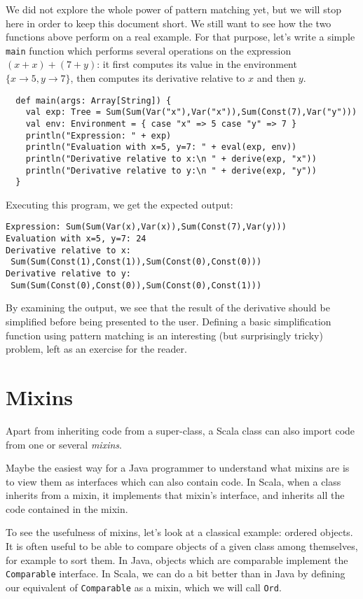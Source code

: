 \documentclass[a4paper,12pt,twoside,titlepage]{article}
\begin{document}
We did not explore the whole power of pattern matching yet, but we
will stop here in order to keep this document short. We still want to
see how the two functions above perform on a real example. For that
purpose, let's write a simple \lstinline?main? function which performs
several operations on the expression $(x+x)+(7+y)$: it first computes
its value in the environment $\{x\rightarrow 5, y\rightarrow 7\}$, then
computes its derivative relative to $x$ and then $y$.
\begin{lstlisting}
  def main(args: Array[String]) {
    val exp: Tree = Sum(Sum(Var("x"),Var("x")),Sum(Const(7),Var("y")))
    val env: Environment = { case "x" => 5 case "y" => 7 }
    println("Expression: " + exp)
    println("Evaluation with x=5, y=7: " + eval(exp, env))
    println("Derivative relative to x:\n " + derive(exp, "x"))
    println("Derivative relative to y:\n " + derive(exp, "y"))
  }
\end{lstlisting}
Executing this program, we get the expected output:
\begin{verbatim}
Expression: Sum(Sum(Var(x),Var(x)),Sum(Const(7),Var(y)))
Evaluation with x=5, y=7: 24
Derivative relative to x:
 Sum(Sum(Const(1),Const(1)),Sum(Const(0),Const(0)))
Derivative relative to y:
 Sum(Sum(Const(0),Const(0)),Sum(Const(0),Const(1)))
\end{verbatim}
By examining the output, we see that the result of the derivative
should be simplified before being presented to the user. Defining a
basic simplification function using pattern matching is an interesting
(but surprisingly tricky) problem, left as an exercise for the reader.

\section{Mixins}\label{sec:mixins}

Apart from inheriting code from a super-class, a Scala class can also
import code from one or several \emph{mixins}.

Maybe the easiest way for a Java programmer to understand what mixins
are is to view them as interfaces which can also contain code. In
Scala, when a class inherits from a mixin, it implements that mixin's
interface, and inherits all the code contained in the mixin.

To see the usefulness of mixins, let's look at a classical example:
ordered objects. It is often useful to be able to compare objects of a
given class among themselves, for example to sort them. In Java,
objects which are comparable implement the \lstinline?Comparable?
interface. In Scala, we can do a bit better than in Java by defining
our equivalent of \lstinline?Comparable? as a mixin, which we will call
\lstinline?Ord?.
\end{document}

